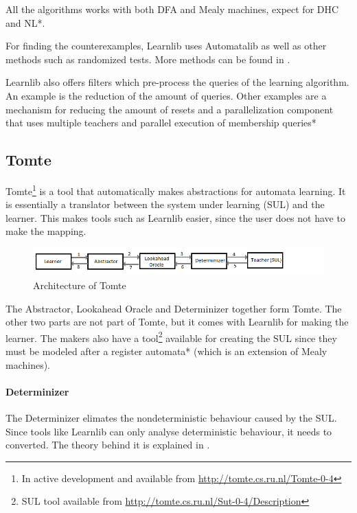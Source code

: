 \documentclass[multi,crop=false,class=article]{standalone}
\begin{document}
All the algorithms works with both DFA and Mealy machines, expect for 
DHC\cite{Merten2012} and NL*\cite{Bollig2009}.

For finding the counterexamples, Learnlib uses Automatalib as well as other
methods such as randomized tests. More methods can be found in 
\cite{Isberner2015b}.

Learnlib also offers filters which pre-process the queries of the learning 
algorithm. An example is the reduction of the amount of queries. Other examples 
are a mechanism for reducing the amount of resets\cite{Bauer2012} and a 
parallelization component that uses multiple teachers and parallel execution of 
membership queries\cite{Henrix2015,Howar2012}*     


\subsection{Tomte}
\label{ssec:tomte}
Tomte\footnote{In active development and available from
\url{http://tomte.cs.ru.nl/Tomte-0-4}} is a tool that automatically makes
abstractions for automata learning. It is essentially a translator between the
system under learning (SUL) and the learner. This makes tools such as Learnlib 
easier, since the user does not have to make the mapping.

\begin{figure}[!ht]
	\includegraphics[width=\textwidth]{Tool_images/tomte_network.png}
	\caption{Architecture of Tomte}
	\label{fig:tomte_arch_interaction}
\end{figure}

The Abstractor, Lookahead Oracle and Determinizer together form Tomte. The
other two parts are not part of Tomte, but it comes with Learnlib for making 
the learner. The makers also have a tool\footnote{SUL tool available from 
\url{http://tomte.cs.ru.nl/Sut-0-4/Description}} available for creating the SUL 
since they must be modeled after a register automata\cite{Aarts2015,Tomte2014}* 
(which is an extension of Mealy machines).

\paragraph{Determinizer} The Determinizer elimates the nondeterministic
behaviour caused by the SUL. Since tools like Learnlib can only analyse
deterministic behaviour, it needs to converted. The theory behind it is
explained in \cite{Aarts2015}.
\end{document}

